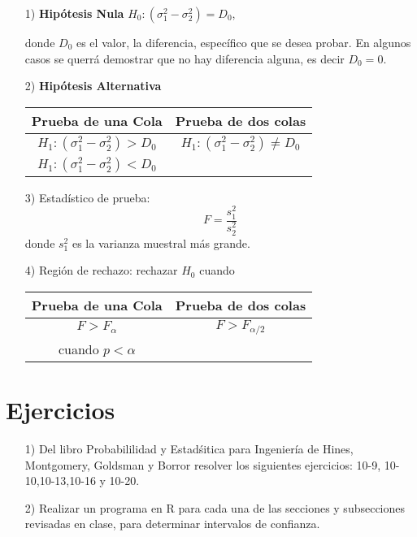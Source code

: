 \begin{frame}
\begin{frame}
\begin{itemize}
\item[1) ] \textbf{Hip\'otesis Nula} $H_{0}:\left(\sigma^{2}_{1}-\sigma^{2}_{2}\right)=D_{0}$,\medskip

donde $D_{0}$ es el valor, la diferencia, espec\'ifico que se desea probar. En algunos casos se querr\'a demostrar que no hay diferencia alguna, es decir $D_{0}=0$.

\item[2) ] \textbf{Hip\'otesis Alternativa}
\begin{tabular}{cc}\hline
\textbf{Prueba de una Cola} & \textbf{Prueba de dos colas}\\\hline
$H_{1}:\left(\sigma^{2}_{1}-\sigma^{2}_{2}\right)>D_{0}$ & $H_{1}:\left(\sigma^{2}_{1}-\sigma^{2}_{2}\right)\neq D_{0}$\\ 
$H_{1}:\left(\sigma^{2}_{1}-\sigma^{2}_{2}\right)<D_{0}$&\\
\end{tabular}

\end{itemize}


\begin{itemize}
\item[3) ] Estad\'istico de prueba:
$$F=\frac{s_{1}^{2}}{s_{2}^{2}}$$
donde $s_{1}^{2}$ es la varianza muestral m\'as grande.
\item[4) ] Regi\'on de rechazo: rechazar $H_{0}$ cuando
\begin{tabular}{cc}\hline
\textbf{Prueba de una Cola} & \textbf{Prueba de dos colas}\\\hline
$F>F_{\alpha}$ & $F>F_{\alpha/2}$\\
 cuando $p<\alpha$&\\
\end{tabular}


\end{itemize}




\section{Ejercicios}


\begin{itemize}
\item[1) ] Del libro Probabililidad y Estad\'sitica para Ingenier\'ia de Hines, Montgomery, Goldsman y Borror resolver los siguientes ejercicios: 10-9, 10-10,10-13,10-16 y 10-20.

\item[2) ] Realizar un programa en R para cada una de las secciones y subsecciones revisadas en clase, para determinar intervalos de confianza.


\end{itemize}
\end{frame}
\end{frame}
